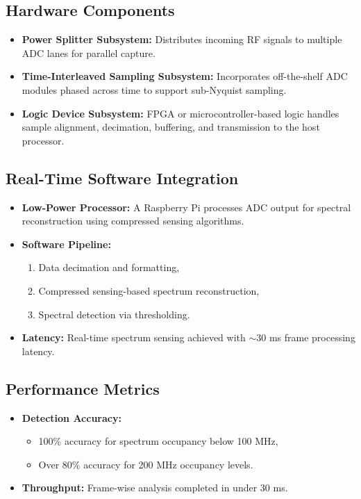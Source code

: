 \documentclass[14pt]{book}
\begin{document}
\subsection{Hardware Components}

\begin{itemize}
	\item \textbf{Power Splitter Subsystem:} Distributes incoming RF signals to multiple ADC lanes for parallel capture.
	
	\item \textbf{Time-Interleaved Sampling Subsystem:} Incorporates off-the-shelf ADC modules phased across time to support sub-Nyquist sampling.
	
	\item \textbf{Logic Device Subsystem:} FPGA or microcontroller-based logic handles sample alignment, decimation, buffering, and transmission to the host processor.
\end{itemize}

\subsection{Real-Time Software Integration}

\begin{itemize}
	\item \textbf{Low-Power Processor:} A Raspberry Pi processes ADC output for spectral reconstruction using compressed sensing algorithms.
	
	\item \textbf{Software Pipeline:}
	\begin{enumerate}
		\item Data decimation and formatting,
		\item Compressed sensing-based spectrum reconstruction,
		\item Spectral detection via thresholding.
	\end{enumerate}
	
	\item \textbf{Latency:} Real-time spectrum sensing achieved with $\sim$30 ms frame processing latency.
\end{itemize}

\subsection{Performance Metrics}

\begin{itemize}
	\item \textbf{Detection Accuracy:}
	\begin{itemize}
		\item 100\% accuracy for spectrum occupancy below 100 MHz,
		\item Over 80\% accuracy for 200 MHz occupancy levels.
	\end{itemize}
	
	\item \textbf{Throughput:} Frame-wise analysis completed in under 30 ms.
\end{itemize}
\end{document}
